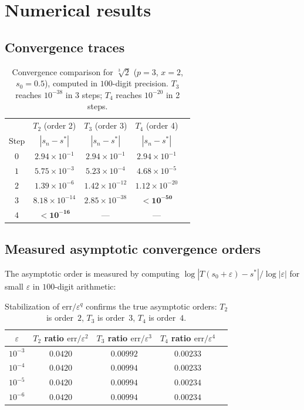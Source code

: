 \documentclass[10pt,a4paper,oneside]{book}
\theoremstyle{definition}
\theoremstyle{remark}
\newcommand{\cbrt}[1]{\sqrt[3]{#1}}
\newcommand{\eps}{\varepsilon}
\begin{document}
\section{Numerical results}
\label{sec:numerical}

\subsection{Convergence traces}

\begin{table}[H]
\centering
\renewcommand{\arraystretch}{1.15}
\begin{tabular}{ccccc}
\toprule
& $T_2$ (order 2) & $T_3$ (order 3) & $T_4$ (order 4) \\
Step & $|s_n - s^*|$ & $|s_n - s^*|$ & $|s_n - s^*|$ \\
\midrule
$0$ & $2.94 \times 10^{-1}$ & $2.94 \times 10^{-1}$ & $2.94 \times 10^{-1}$ \\
$1$ & $5.75 \times 10^{-3}$ & $5.23 \times 10^{-4}$ & $4.68 \times 10^{-5}$ \\
$2$ & $1.39 \times 10^{-6}$ & $1.42 \times 10^{-12}$ & $1.12 \times 10^{-20}$ \\
$3$ & $8.18 \times 10^{-14}$ & $2.85 \times 10^{-38}$ & $\mathbf{< 10^{-50}}$ \\
$4$ & $\mathbf{< 10^{-16}}$ & --- & --- \\
\bottomrule
\end{tabular}
\caption{Convergence comparison for $\cbrt{2}$ ($p=3$, $x=2$, $s_0 = 0.5$), computed in $100$-digit precision.  $T_3$ reaches $10^{-38}$ in 3 steps; $T_4$ reaches $10^{-20}$ in 2 steps.}
\label{tab:traces}
\end{table}

\subsection{Measured asymptotic convergence orders}

The asymptotic order is measured by computing $\log|T(s_0+\eps) - s^*| / \log|\eps|$ for small $\eps$ in $100$-digit arithmetic:

\begin{table}[H]
\centering
\begin{tabular}{ccccc}
\toprule
$\eps$ & $T_2$ ratio $\mathrm{err}/\eps^2$ & $T_3$ ratio $\mathrm{err}/\eps^3$ & $T_4$ ratio $\mathrm{err}/\eps^4$ \\
\midrule
$10^{-3}$ & $0.0420$ & $0.00992$ & $0.00233$ \\
$10^{-4}$ & $0.0420$ & $0.00994$ & $0.00233$ \\
$10^{-5}$ & $0.0420$ & $0.00994$ & $0.00234$ \\
$10^{-6}$ & $0.0420$ & $0.00994$ & $0.00234$ \\
\bottomrule
\end{tabular}
\caption{Stabilization of $\mathrm{err}/\eps^q$ confirms the true asymptotic orders: $T_2$ is order~$2$, $T_3$ is order~$3$, $T_4$ is order~$4$.}
\label{tab:orders}
\end{table}
\end{document}
